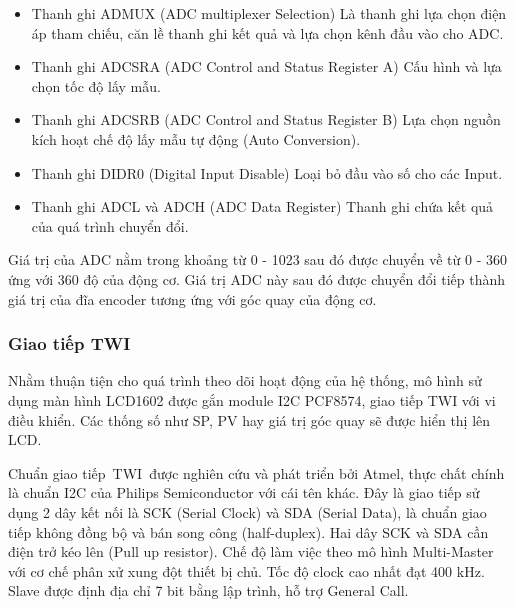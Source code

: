 \begin{itemize}
	
	\item Thanh ghi ADMUX (ADC multiplexer Selection)
	Là thanh ghi lựa chọn điện áp tham chiếu, căn lề thanh ghi kết quả và lựa chọn kênh đầu vào cho ADC.
	
	\item Thanh ghi ADCSRA (ADC Control and Status Register A)
	Cấu hình và lựa chọn tốc độ lấy mẫu.
	
	\item Thanh ghi ADCSRB (ADC Control and Status Register B)
	Lựa chọn nguồn kích hoạt chế độ lấy mẫu tự động (Auto Conversion).
	
	\item Thanh ghi DIDR0 (Digital Input Disable)
	Loại bỏ đầu vào số cho các Input.
	
	\item Thanh ghi ADCL và ADCH (ADC Data Register)
	Thanh ghi chứa kết quả của quá trình chuyển đổi.
	
\end{itemize}

Giá trị của ADC nằm trong khoảng từ 0 - 1023 sau đó được chuyển về từ 0 - 360 ứng với 360 độ của động cơ. Giá trị ADC này sau đó được chuyển đổi tiếp thành giá trị của đĩa encoder tương ứng với góc quay của động cơ.

\subsubsection{Giao tiếp TWI}

Nhằm thuận tiện cho quá trình theo dõi hoạt động của hệ thống, mô hình sử dụng màn hình LCD1602 được gắn module I2C PCF8574, giao tiếp TWI với vi điều khiển. Các thống số như SP, PV hay giá trị góc quay sẽ được hiển thị lên LCD.

Chuẩn giao tiếp TWI được nghiên cứu và phát triển bởi Atmel, thực chất chính là chuẩn I2C của Philips Semiconductor với cái tên khác. Đây là giao tiếp sử dụng 2 dây kết nối là SCK (Serial Clock) và SDA (Serial Data), là chuẩn giao tiếp không đồng bộ và bán song công (half-duplex). Hai dây SCK và SDA cần điện trở kéo lên (Pull up resistor). Chế độ làm việc theo mô hình Multi-Master với cơ chế phân xử xung đột thiết bị chủ. Tốc độ clock cao nhất đạt 400 kHz. Slave được định địa chỉ 7 bit bằng lập trình, hỗ trợ General Call.

